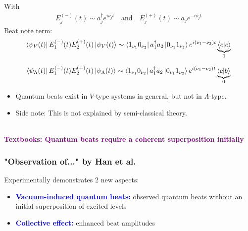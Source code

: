 \documentclass{beamer}
\theoremstyle{definition}
\begin{document}
\begin{frame}
With
\begin{align*}
E^{(-)}_j(t) \sim a_j^\dagger e^{i\nu_j t} \quad \text{and} \quad E^{(+)}_j(t) \sim a_j e^{-i\nu_j t} 
\end{align*}
Beat note term:
\begin{equation*}
\bra{\psi_V(t)} E_1^{(-)}(t) E_2^{(+)}(t)  \ket{\psi_V(t)} \sim \bra{1_{\nu_1} 0_{\nu_2}} a_1^\dagger a_2 \ket{0_{\nu_1} 1_{\nu_2}} e^{i(\nu_1 - \nu_2)t} \underbrace{\braket{c}}_{1}
\end{equation*}

\begin{equation*}
\bra{\psi_\Lambda(t)} E_1^{(-)}(t) E_2^{(+)}(t)  \ket{\psi_\Lambda(t)} \sim \bra{1_{\nu_1} 0_{\nu_2}} a_1^\dagger a_2 \ket{0_{\nu_1} 1_{\nu_2}} e^{i(\nu_1 - \nu_2)t} \underbrace{\bra{c}\ket{b}}_{0}
\end{equation*}



\begin{itemize}
	\item Quantum beats exist in $V$-type systems in general, but not in $\Lambda$-type.
	
	
	\item Side note: This is not explained by semi-classical theory.
\end{itemize}

$\,$\\


\textcolor{purple}{\textbf{Textbooks: Quantum beats require a coherent superposition initially}}


\end{frame}



\begin{frame}
	\frametitle{"Observation of..." by Han et al.}
	
	Experimentally demonstrates 2 new aspects:
	\begin{itemize}
		\item \textbf{\textcolor{blue}{Vacuum-induced quantum beats:}} observed quantum beats without an initial superposition of excited levels
		
		
		\item \textbf{\textcolor{blue}{Collective effect:}} enhanced beat amplitudes 
	\end{itemize}
	
	
	
	
	
	
\end{frame}
\end{document}
